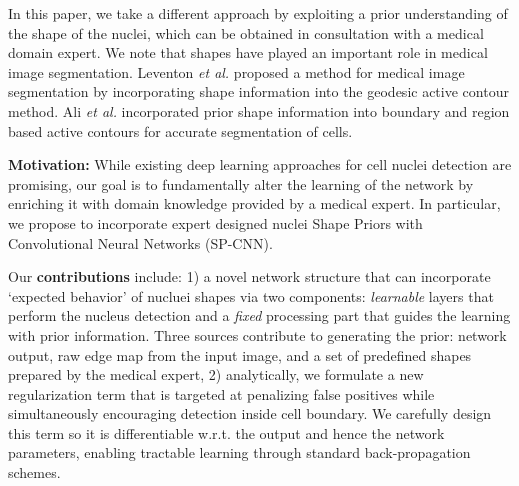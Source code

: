 \documentclass{article}
\begin{document}
In this paper, we take a different approach by exploiting a prior understanding of the shape of the nuclei, which can be obtained in consultation with a medical domain expert. We note that
shapes have played an important role in medical image segmentation. Leventon \textit{et al.} \cite{Leventon_SP_2000} proposed a method for medical image segmentation by incorporating shape information into the geodesic active contour method. Ali \textit{et al.} \cite{Ali_SP_2012} incorporated prior shape information into boundary and region based active contours for accurate segmentation of cells. 




\noindent \textbf{Motivation:}
While existing deep learning approaches for cell nuclei detection are promising, our goal is to fundamentally alter the learning of the network by enriching it with domain knowledge provided by a medical expert. In particular, we propose to incorporate expert designed nuclei Shape Priors with Convolutional Neural Networks (SP-CNN). 

Our \textbf{contributions} include: 1) a novel network structure that can incorporate `expected behavior' of nucluei shapes via two components: {\em learnable} layers that perform the nucleus detection and a {\em fixed} processing part that guides the learning with prior information. Three sources contribute to generating the prior: network output, raw edge map from the input image, and a set of predefined shapes prepared by the medical expert, 2) analytically, we formulate a new regularization term that is targeted at penalizing false positives while simultaneously encouraging detection inside cell boundary. We carefully design this term so it is differentiable w.r.t. the output and hence the network parameters, enabling tractable learning through standard back-propagation schemes. \vspace{-3pt}
\end{document}
